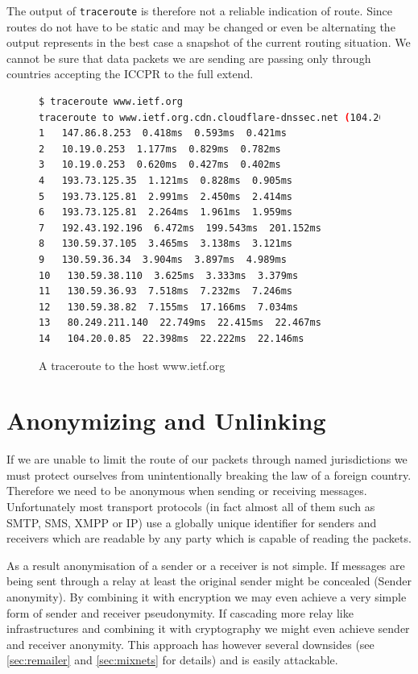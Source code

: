 The output of \verb|traceroute| is therefore not a reliable indication of route. Since routes do not have to be static and may be changed or even be alternating the output represents in the best case a snapshot of the current routing situation. We cannot be sure that data packets we are sending are passing only through countries accepting the ICCPR to the full extend.
\begin{figure}[H]
	\begin{lstlisting}[language=bash,breaklines=true,basicstyle=\tiny]
$ traceroute www.ietf.org
traceroute to www.ietf.org.cdn.cloudflare-dnssec.net (104.20.0.85), 64 hops max
1   147.86.8.253  0.418ms  0.593ms  0.421ms
2   10.19.0.253  1.177ms  0.829ms  0.782ms
3   10.19.0.253  0.620ms  0.427ms  0.402ms
4   193.73.125.35  1.121ms  0.828ms  0.905ms
5   193.73.125.81  2.991ms  2.450ms  2.414ms
6   193.73.125.81  2.264ms  1.961ms  1.959ms
7   192.43.192.196  6.472ms  199.543ms  201.152ms
8   130.59.37.105  3.465ms  3.138ms  3.121ms
9   130.59.36.34  3.904ms  3.897ms  4.989ms
10   130.59.38.110  3.625ms  3.333ms  3.379ms
11   130.59.36.93  7.518ms  7.232ms  7.246ms
12   130.59.38.82  7.155ms  17.166ms  7.034ms
13   80.249.211.140  22.749ms  22.415ms  22.467ms
14   104.20.0.85  22.398ms  22.222ms  22.146ms
	\end{lstlisting}
	\caption{A traceroute to the host www.ietf.org}
\end{figure}

\section{Anonymizing and Unlinking}
If we are unable to limit the route of our packets through named jurisdictions we must protect ourselves from unintentionally breaking the law of a foreign country. Therefore we need to be anonymous when sending or receiving messages. Unfortunately most transport protocols (in fact almost all of them such as SMTP, SMS, XMPP or IP) use a globally unique identifier for senders and receivers which are readable by any party which is capable of reading the packets. 

As a result anonymisation of a sender or a receiver is not simple. If messages are being sent through a relay at least the original sender might be concealed (Sender anonymity). By combining it with encryption we may even achieve a very simple form of sender and receiver pseudonymity. If cascading more relay like infrastructures and combining it with cryptography we might even achieve sender and receiver anonymity. This approach has however several downsides (see \ref{sec:remailer} and \ref{sec:mixnets} for details) and is easily attackable.

